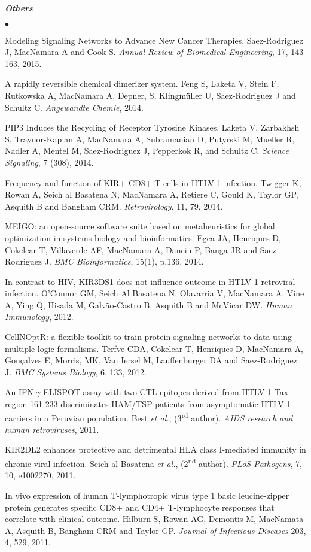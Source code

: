 \documentclass[overlapped, line, 11pt, letterpaper]{res}
\renewenvironment{itemize}{
\begin{list}{$\bullet$}
{\setlength{\itemsep}{0cm}}
}{\end{list}}
\begin{document}
\begin{resume}
\textbf{\emph{Others}}
\begin{itemize}
\item Modeling Signaling Networks to Advance New Cancer Therapies. Saez-Rodriguez J, MacNamara A and Cook S. \emph{Annual Review of Biomedical Engineering}, 17, 143-163, 2015.
\item A rapidly reversible chemical dimerizer system. Feng S, Laketa V, Stein F, Rutkowska A, MacNamara A, Depner, S, Klingm\"uller U, Saez-Rodriguez J and Schultz C. \emph{Angewandte Chemie}, 2014.
\item PIP3 Induces the Recycling of Receptor Tyrosine Kinases. Laketa V, Zarbakhsh S, Traynor-Kaplan A, MacNamara A, Subramanian D, Putyrski M, Mueller R, Nadler A, Mentel M, Saez-Rodriguez J, Pepperkok R, and Schultz C. \emph{Science Signaling}, 7 (308), 2014.
\item Frequency and function of KIR+ CD8+ T cells in HTLV-1 infection. Twigger K, Rowan A, Seich al Basatena N, MacNamara A, Retiere C, Gould K, Taylor GP, Asquith B and Bangham CRM. \emph{Retrovirology}, 11, 79, 2014.
\item MEIGO: an open-source software suite based on metaheuristics for global optimization in systems biology and bioinformatics. Egea JA, Henriques D, Cokelear T, Villaverde AF, MacNamara A, Danciu P, Banga JR and Saez-Rodriguez J. \emph{BMC Bioinformatics}, 15(1), p.136, 2014.
\item In contrast to HIV, KIR3DS1 does not influence outcome in HTLV-1 retroviral infection. O'Connor GM, Seich Al Basatena N, Olavarria V, MacNamara A, Vine A, Ying Q, Hisada M, Galv\~ao-Castro B, Asquith B and McVicar DW. \emph{Human Immunology}, 2012.
\item CellNOptR: a flexible toolkit to train protein signaling networks to data using multiple logic formalisms. Terfve CDA, Cokelear T, Henriques D, MacNamara A, Gon\c{c}alves E, Morris, MK, Van Iersel M, Lauffenburger DA and Saez-Rodriguez J. \emph{BMC Systems Biology}, 6, 133, 2012.
\item An IFN-$\gamma$ ELISPOT assay with two CTL epitopes derived from HTLV-1 Tax region 161-233 discriminates HAM/TSP patients from asymptomatic HTLV-1 carriers in a Peruvian population. Best \emph{et al.}, (3\textsuperscript{rd} author). \emph{AIDS research and human retroviruses}, 2011.
\item KIR2DL2 enhances protective and detrimental HLA class I-mediated immunity in chronic viral infection. Seich al Basatena \emph{et al.}, (2\textsuperscript{nd} author). \emph{PLoS Pathogens}, 7, 10, e1002270, 2011.
\item In vivo expression of human T-lymphotropic virus type 1 basic leucine-zipper protein generates specific CD8+ and CD4+ T-lymphocyte responses that correlate with clinical outcome. Hilburn S, Rowan AG, Demontis M, MacNamata A, Asquith B, Bangham CRM and Taylor GP. \emph{Journal of Infectious Diseases} 203, 4, 529, 2011.
\end{itemize}


\end{resume}
\end{document}
